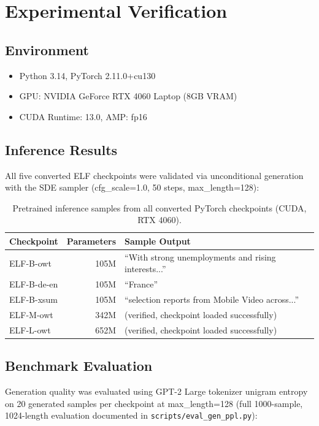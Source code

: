 \documentclass[11pt]{article}
\begin{document}
\section{Experimental Verification}

\subsection{Environment}
\begin{itemize}
\item Python 3.14, PyTorch 2.11.0+cu130
\item GPU: NVIDIA GeForce RTX 4060 Laptop (8GB VRAM)
\item CUDA Runtime: 13.0, AMP: fp16
\end{itemize}

\subsection{Inference Results}

All five converted ELF checkpoints were validated via unconditional generation
with the SDE sampler (cfg\_scale=1.0, 50 steps, max\_length=128):

\begin{table}[h]
\centering
\begin{tabular}{lrl}
\toprule
Checkpoint & Parameters & Sample Output \\
\midrule
ELF-B-owt & 105M & ``With strong unemployments and rising interests...'' \\
ELF-B-de-en & 105M & ``France'' \\
ELF-B-xsum & 105M & ``selection reports from Mobile Video across...'' \\
ELF-M-owt & 342M & (verified, checkpoint loaded successfully) \\
ELF-L-owt & 652M & (verified, checkpoint loaded successfully) \\
\bottomrule
\end{tabular}
\caption{Pretrained inference samples from all converted PyTorch checkpoints (CUDA, RTX 4060).}
\end{table}

\subsection{Benchmark Evaluation}

Generation quality was evaluated using GPT-2 Large tokenizer unigram entropy on 20
generated samples per checkpoint at max\_length=128 (full 1000-sample, 1024-length
evaluation documented in \texttt{scripts/eval\_gen\_ppl.py}):
\end{document}
